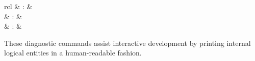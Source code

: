 \begin{isabellebody}
\begin{isamarkuptext}
\begin{matharray}{rcl}
    \hypertarget{command.prf}{\hyperlink{command.prf}{\mbox{}}} & : &  \\
    \hypertarget{command.full-prf}{\hyperlink{command.full-prf}{\mbox{}}} & : &  \\
    \hypertarget{command.pr}{\hyperlink{command.pr}{\mbox{}}} & : &  \\
  \end{matharray}

  These diagnostic commands assist interactive development by printing
  internal logical entities in a human-readable fashion.


\end{isamarkuptext}
\end{isabellebody}

